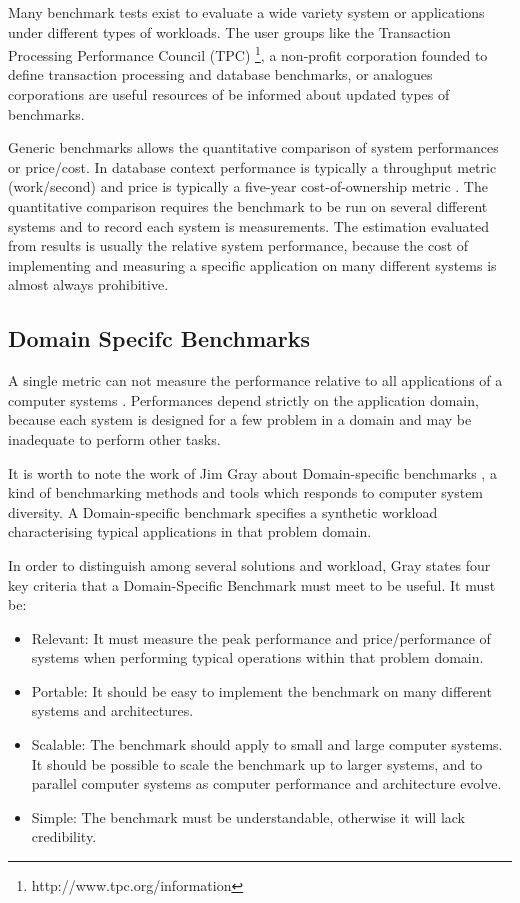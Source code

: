 Many benchmark tests exist to evaluate a wide variety system or applications under different types of workloads. The user groups like the Transaction Processing Performance Council (TPC) \footnote{http://www.tpc.org/information},  a non-profit corporation founded to define transaction processing and database benchmarks, or analogues corporations are useful resources of be informed about updated types of benchmarks. 

Generic benchmarks allows the quantitative comparison of system performances or price/cost. In database context performance is typically a throughput metric (work/second) and price is typically a five-year cost-of-ownership metric \cite{DBLP:books/mk/Gray93}. The quantitative comparison requires the benchmark to be run on several different systems and to record each system is measurements.  The estimation evaluated from results is usually the relative system performance, because the cost of implementing and measuring a specific application on many different systems is almost always prohibitive.

\subsection{Domain Specifc Benchmarks}  \label{sec:tcp}

A single metric can not measure the performance relative to all applications of a computer systems \cite{DBLP:books/mk/Gray93}. Performances depend strictly on the application domain, because each system is designed for a few problem in a domain and may be inadequate to perform other tasks.

It is worth to note the work of Jim Gray about Domain-specific benchmarks \cite{DBLP:books/mk/Gray93}, a kind of benchmarking methods and tools  which responds to computer system diversity. A Domain-specific benchmark specifies a synthetic workload characterising typical applications in that problem domain. 

In order to distinguish among several solutions and workload, Gray states four key criteria that a Domain-Specific Benchmark must meet to be useful. It must be:
\begin{itemize}
\item Relevant: It must measure the peak performance and price/performance of systems when performing typical operations within that problem domain.
\item Portable: It should be easy to implement the benchmark on many different systems and architectures.
\item Scalable: The benchmark should apply to small and large computer systems. It should be possible to scale the benchmark up to larger systems, and to parallel computer systems as computer performance and architecture evolve.
\item Simple: The benchmark must be understandable, otherwise it will lack credibility.
\end{itemize} 

